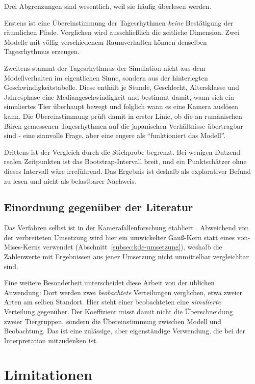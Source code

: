 \documentclass[12pt,a4paper]{report}
\begin{document}
Drei Abgrenzungen sind wesentlich, weil sie häufig überlesen werden.

Erstens ist eine Übereinstimmung der Tagesrhythmen \emph{keine} Bestätigung der räumlichen
Pfade. Verglichen wird ausschließlich die zeitliche Dimension. Zwei Modelle mit völlig
verschiedenem Raumverhalten können denselben Tagesrhythmus erzeugen.

Zweitens stammt der Tagesrhythmus der Simulation nicht aus dem Modellverhalten im
eigentlichen Sinne, sondern aus der hinterlegten Geschwindigkeitstabelle. Diese enthält je
Stunde, Geschlecht, Altersklasse und Jahresphase eine Mediangeschwindigkeit und bestimmt
damit, wann sich ein simuliertes Tier überhaupt bewegt und folglich wann es eine Kamera
auslösen kann. Die Übereinstimmung prüft damit in erster Linie, ob die an rumänischen
Bären gemessenen Tagesrhythmen auf die japanischen Verhältnisse übertragbar sind - eine
sinnvolle Frage, aber eine engere als \enquote{funktioniert das Modell}.

Drittens ist der Vergleich durch die Stichprobe begrenzt. Bei wenigen Dutzend realen
Zeitpunkten ist das Bootstrap-Intervall breit, und ein Punktschätzer ohne dieses Intervall
wäre irreführend. Das Ergebnis ist deshalb als explorativer Befund zu lesen und nicht als
belastbarer Nachweis.

\subsection{Einordnung gegenüber der Literatur}
\label{subsec:literatureinordnung}

Das Verfahren selbst ist in der Kamerafallenforschung etabliert
\cite{RidoutLinkie2009, Rowcliffe2014}. Abweichend von der verbreiteten Umsetzung wird hier
ein umwickelter Gauß-Kern statt eines von-Mises-Kerns verwendet
(Abschnitt~\ref{subsec:kde-umsetzung}), weshalb die Zahlenwerte mit Ergebnissen aus jener
Umsetzung nicht unmittelbar vergleichbar sind.

Eine weitere Besonderheit unterscheidet diese Arbeit von der üblichen Anwendung: Dort werden
zwei \emph{beobachtete} Verteilungen verglichen, etwa zweier Arten am selben Standort. Hier
steht einer beobachteten eine \emph{simulierte} Verteilung gegenüber. Der Koeffizient misst
damit nicht die Überschneidung zweier Tiergruppen, sondern die Übereinstimmung zwischen
Modell und Beobachtung. Das ist eine zulässige, aber eigenständige Verwendung, die bei der
Interpretation mitzudenken ist.

\section{Limitationen}
\label{sec:limitationen}
\end{document}
